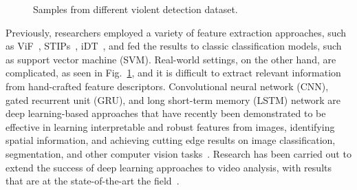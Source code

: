 \begin{figure}[t]
    \centering
    
    
    \caption{Samples from different violent detection dataset.}
    \label{fig:sample_dataset}
\end{figure}

Previously, researchers employed a variety of feature extraction approaches, such as ViF~\cite{hassner2012violent_6}, STIPs~\cite{de2010violence_7}, iDT~\cite{wang2013action_9}, and fed the results to classic classification models, such as support vector machine (SVM).
Real-world settings, on the other hand, are complicated, as seen in Fig.~\ref{fig:sample_dataset}, and it is difficult to extract relevant information from hand-crafted feature descriptors.
Convolutional neural network (CNN), gated  recurrent  unit (GRU),  and  long  short-term  memory  (LSTM)  network  are deep learning-based approaches that have recently been demonstrated to be effective in learning interpretable and robust features from images, identifying spatial information, and achieving cutting edge results on image classification, segmentation, and other computer vision tasks~\cite{tan2019efficientnet,lin2017fpn}. 
Research has been carried out to extend the success of deep learning approaches to video analysis, with results that are at the state-of-the-art the field~\cite{eco14zolfaghari2018, 3dres101_hara2018can}.

